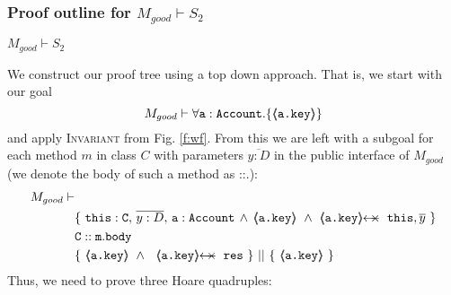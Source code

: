  \subsubsection{Proof outline for $M_{good} \vdash S_2$}



\begin{lemma}
\label{lemma:exampleKeyProtect}
$M_{good} \vdash S_2$
\end{lemma}
\begin{proofO}
We construct our proof tree using a top down approach.  That is, we start with our goal
$$M_{good} \vdash \forall {\mbox{\normalfont{\texttt{a}}}:\mbox{\normalfont{\texttt{Account}}}}.{{\{}}{\langle\!\!\langle \mbox{\normalfont{\texttt{\mbox{\normalfont{\texttt{a.key}}}}}} \rangle\!\!\rangle}{{\}}}$$
and apply  \textsc{Invariant} from Fig. \ref{f:wf}.
From this we are left with a subgoal for each method $m$ in  class $C$ with parameters $\overline{y:D}$ in the public interface of $M_{good}$ (we denote the body of such a method as ::.):
\small
\begin{align*}
M_{good} \vdash & \\
		& \{ \ \prg{this}:\prg{C},\, \overline{y:D},\, \prg{a}:\prg{Account}\, \wedge\,
		   {\inside{\prg{a.key}}}\ \wedge\       \protectedFrom {\prg{a.key}} {\prg{this},\overline y} \  \} \\
		& \prg{C}::\prg{m}.\prg{body}\  \\
		&
                   \{\ {\inside{\prg{a.key}}}\ \wedge\ \ \protectedFrom {\prg{a.key}} {\prg{res}}   \ \}\ ||\ \{\ {\inside{\prg{a.key} } } \ \} \\
\end{align*}
\normalsize
{Thus, we need to prove   three Hoare quadruples:}
    

\end{proofO}
